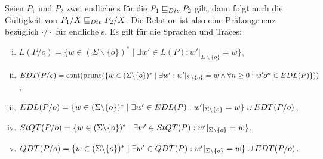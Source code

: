\begin{Satz}
  \label{DivHidingSatz}
  Seien $P_1$ und $P_2$ zwei endliche \MEIO{}s für die $P_1 \sqsubseteq  _{Div} P_2$ gilt,
  dann folgt auch die Gültigkeit von $P_1/X \sqsubseteq  _{Div} P_2/X$. Die Relation \DRel{}
  ist also eine Präkongruenz bezüglich $\cdot /\cdot$ für endliche \MEIO{}s. Es
  gilt für die Sprachen und Traces:
  \begin{enumerate}[(i)]
    \item $L(P/o) = \{w\in (\Sigma\backslash \{o\})^*\mid \exists w'\in L(P):
      w'|_{\Sigma\backslash \{o\}} = w\}$,
    \item $EDT (P/o) = \mathrm{cont} (\mathrm{prune} (\{w\in (\Sigma\backslash \{o\})^*\mid
      \exists w':w'|_{\Sigma\backslash \{o\}} = w\land \forall n\geq 0:
      w'o^n\in EDL (P)\}))$,
    \item $EDL (P/o) = \{w\in (\Sigma\backslash \{o\})^*\mid \exists w'\in
      EDL(P): w'|_{\Sigma\backslash \{o\}} = w\} \cup EDT (P/o)$,
    \item $StQT (P/o) = \{w\in (\Sigma\backslash \{o\})^*\mid \exists w'\in
      StQT(P): w'|_{\Sigma\backslash \{o\}} = w\}$,
    \item $QDT (P/o) = \{w\in (\Sigma\backslash \{o\})^*\mid \exists w'\in
      QDT(P): w'|_{\Sigma\backslash \{o\}} = w\} \cup EDT (P/o)$.
  \end{enumerate}
\end{Satz}
